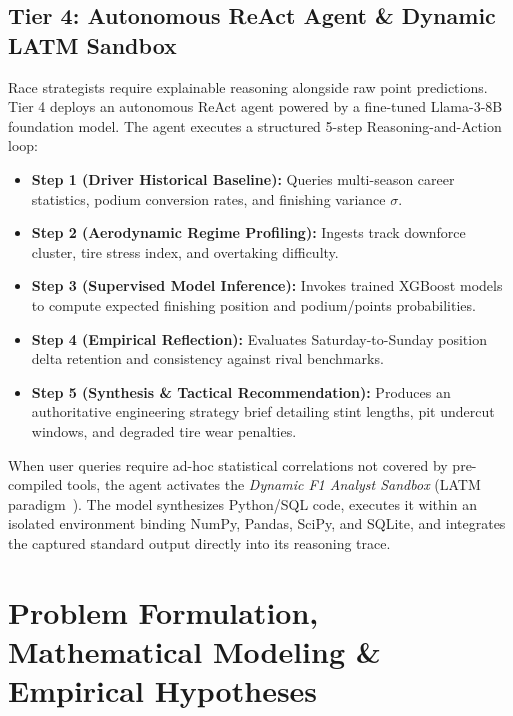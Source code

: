 \documentclass[journal]{IEEEtran}
\begin{document}
\subsection{Tier 4: Autonomous ReAct Agent \& Dynamic LATM Sandbox}
Race strategists require explainable reasoning alongside raw point predictions. Tier 4 deploys an autonomous ReAct agent powered by a fine-tuned Llama-3-8B foundation model. The agent executes a structured 5-step Reasoning-and-Action loop:
\begin{itemize}
    \item \textbf{Step 1 (Driver Historical Baseline):} Queries multi-season career statistics, podium conversion rates, and finishing variance $\sigma$.
    \item \textbf{Step 2 (Aerodynamic Regime Profiling):} Ingests track downforce cluster, tire stress index, and overtaking difficulty.
    \item \textbf{Step 3 (Supervised Model Inference):} Invokes trained XGBoost models to compute expected finishing position and podium/points probabilities.
    \item \textbf{Step 4 (Empirical Reflection):} Evaluates Saturday-to-Sunday position delta retention and consistency against rival benchmarks.
    \item \textbf{Step 5 (Synthesis \& Tactical Recommendation):} Produces an authoritative engineering strategy brief detailing stint lengths, pit undercut windows, and degraded tire wear penalties.
\end{itemize}

When user queries require ad-hoc statistical correlations not covered by pre-compiled tools, the agent activates the \textit{Dynamic F1 Analyst Sandbox} (LATM paradigm~\cite{cai2023latm}). The model synthesizes Python/SQL code, executes it within an isolated environment binding NumPy, Pandas, SciPy, and SQLite, and integrates the captured standard output directly into its reasoning trace.

\section{Problem Formulation, Mathematical Modeling \& Empirical Hypotheses}
\label{sec:formulation}
\end{document}
